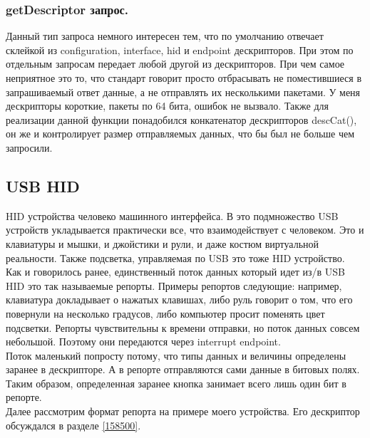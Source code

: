\documentclass[12pt,a4paper]{article}
\begin{document}
\subsubsection{getDescriptor запрос.}
    Данный тип запроса немного интересен тем, что по умолчанию отвечает
    склейкой из configuration, interface, hid и endpoint дескрипторов. При этом
    по отдельным запросам передает любой другой из дескрипторов.
    При чем самое неприятное это
    то, что стандарт говорит просто отбрасывать не поместившиеся в запрашиваемый
    ответ данные, а не отправлять их несколькими пакетами. У меня дескрипторы
    короткие, пакеты по 64 бита, ошибок не вызвало. Также для реализации данной
    функции понадобился конкатенатор дескрипторов descCat(), он же и
    контролирует размер отправляемых данных, что бы был не больше чем запросили.

\subsection{USB HID}
    HID устройства человеко машинного интерфейса. В это подмножество USB
    устройств укладывается практически все, что взаимодействует с человеком.
    Это и клавиатуры и мышки, и джойстики и рули, и даже костюм виртуальной
    реальности. Также подсветка, управляемая по USB это тоже HID устройство.\\
    Как и говорилось ранее, единственный поток данных который идет из/в USB HID
    это так называемые репорты. Примеры репортов следующие:
    например, клавиатура докладывает о нажатых клавишах,
    либо руль говорит о том, что его повернули на несколько градусов, либо
    компьютер просит поменять цвет подсветки. Репорты чувствительны к времени
    отправки, но поток данных совсем небольшой. Поэтому они передаются через
    interrupt endpoint.\\
    Поток маленький попросту потому, что типы данных и величины определены
    заранее в дескрипторе. А в репорте отправляются сами данные в битовых
    полях. Таким образом, определенная заранее кнопка занимает всего лишь один
    бит в репорте.\\
    Далее рассмотрим формат репорта на примере моего устройства. Его дескриптор
    обсуждался в разделе \ref{158500}.
\end{document}
